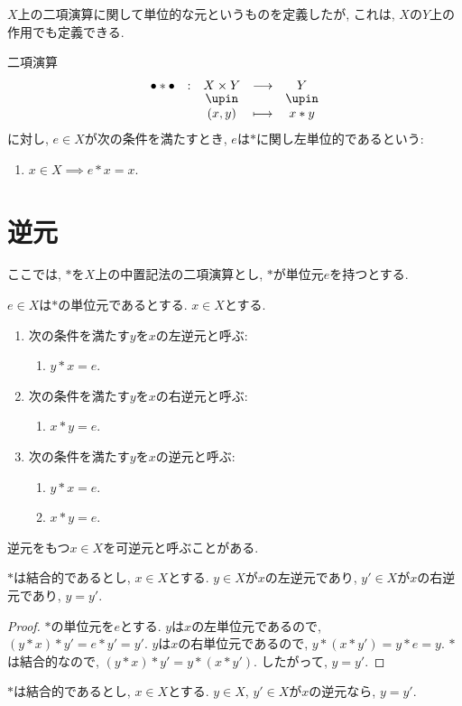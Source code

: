 $X$上の二項演算に関して単位的な元というものを定義したが,
これは, $X$の$Y$上の作用でも定義できる.
\begin{definition}
  二項演算
  \begin{align*}
    \shazo{\tofu\ast\tofu}
          {X\times Y}{Y}
          {(x,y)}{x\ast y}
  \end{align*}
  に対し,
  $e\in X$が次の条件を満たすとき,
  $e$は$\ast$に関し左単位的であるという:
  \begin{enumerate}
  \item $x\in X\implies e\ast x=x$.
  \end{enumerate}
\end{definition}

\section{逆元}
ここでは, $\ast$を$X$上の中置記法の二項演算とし,
$\ast$が単位元$e$を持つとする.
\begin{definition}
  $e\in X$は$\ast$の単位元であるとする.
  $x\in X$とする.
  \begin{enumerate}
  \item 次の条件を満たす$y$を$x$の左逆元と呼ぶ:
    \begin{enumerate}
      \item $y\ast x=e$.
    \end{enumerate}
  \item 次の条件を満たす$y$を$x$の右逆元と呼ぶ:
    \begin{enumerate}
      \item $x\ast y=e$.
    \end{enumerate}
  \item 次の条件を満たす$y$を$x$の逆元と呼ぶ:
    \begin{enumerate}
      \item $y\ast x=e$.
    \item $x\ast y=e$.
    \end{enumerate}  
  \end{enumerate}
  逆元をもつ$x\in X$を可逆元と呼ぶことがある.
\end{definition}

\begin{lemma}
  $\ast$は結合的であるとし,
  $x\in X$とする.
  $y\in X$が$x$の左逆元であり,
  $y'\in X$が$x$の右逆元であり,
  $y=y'$.
\end{lemma}
\begin{proof}
  $\ast$の単位元を$e$とする.
  $y$は$x$の左単位元であるので,
  $(y\ast x) \ast y'=e\ast y'=y'$.
  $y$は$x$の右単位元であるので,
  $y\ast (x \ast y')=y\ast e=y$.
  $\ast$は結合的なので,
  $(y\ast x) \ast y'=y\ast (x \ast y')$.
  したがって, $y=y'$.
\end{proof}
\begin{cor}
\label{cor:uniq:inv}
  $\ast$は結合的であるとし,
  $x\in X$とする.
  $y\in X$, $y'\in X$が$x$の逆元なら,
  $y=y'$.
\end{cor}




